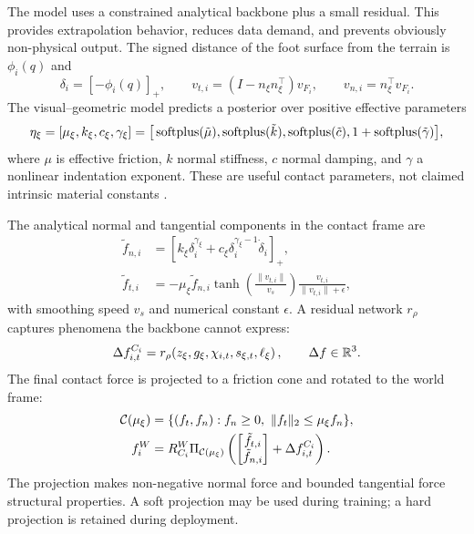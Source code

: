 The model uses a constrained analytical backbone plus a small residual. This provides extrapolation behavior, reduces data demand, and prevents obviously non-physical output. The signed distance of the foot surface from the terrain is $\phi_i(q)$ and
\begin{equation}
\delta_i=[-\phi_i(q)]_+,
\qquad
v_{t,i}=(I-n_\xi n_\xi^\top)v_{F_i},
\qquad
v_{n,i}=n_\xi^\top v_{F_i}.
\label{eq:contact_kinematics}
\end{equation}
The visual--geometric model predicts a posterior over positive effective parameters
\begin{equation}
\eta_\xi=[\mu_\xi,k_\xi,c_\xi,\gamma_\xi]
=\big[\operatorname{softplus}(\tilde\mu),\operatorname{softplus}(\tilde k),\operatorname{softplus}(\tilde c),1+\operatorname{softplus}(\tilde\gamma)\big],
\label{eq:positive_params}
\end{equation}
where $\mu$ is effective friction, $k$ normal stiffness, $c$ normal damping, and $\gamma$ a nonlinear indentation exponent. These are useful contact parameters, not claimed intrinsic material constants \citep{chen2024terrain}.

The analytical normal and tangential components in the contact frame are
\begin{align}
\tilde f_{n,i} &= \left[k_\xi\delta_i^{\gamma_\xi}+c_\xi\delta_i^{\gamma_\xi-1}\dot\delta_i\right]_+, \\
\tilde f_{t,i} &= -\mu_\xi\tilde f_{n,i}
\tanh\!\left(\frac{\lVert v_{t,i}\rVert}{v_s}\right)
\frac{v_{t,i}}{\lVert v_{t,i}\rVert+\epsilon},
\label{eq:analytical_contact}
\end{align}
with smoothing speed $v_s$ and numerical constant $\epsilon$. A residual network $r_\rho$ captures phenomena the backbone cannot express:
\begin{equation}
\Delta f^{C_i}_{i,t}=r_\rho\!\left(z_\xi,g_\xi,\chi_{i,t},s_{\xi,t},\ell_\xi\right),
\qquad \Delta f\in\mathbb{R}^3.
\label{eq:force_residual}
\end{equation}
The final contact force is projected to a friction cone and rotated to the world frame:
\begin{align}
\mathcal{C}(\mu_\xi)&=\{(f_t,f_n): f_n\ge 0,\ \lVert f_t\rVert_2\le\mu_\xi f_n\},\\
f_i^W&=R^W_{C_i}\Pi_{\mathcal{C}(\mu_\xi)}
\left(
\begin{bmatrix}\tilde f_{t,i}\\ \tilde f_{n,i}\end{bmatrix}
+\Delta f^{C_i}_{i,t}
\right).
\label{eq:force_projection}
\end{align}
The projection makes non-negative normal force and bounded tangential force structural properties. A soft projection may be used during training; a hard projection is retained during deployment.

